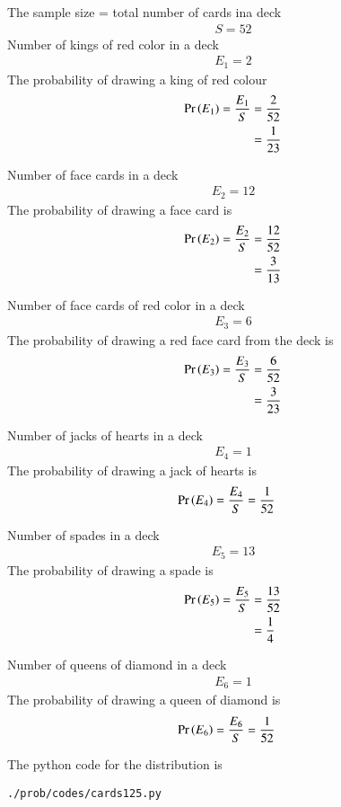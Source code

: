 The sample size = total number of cards ina deck
\begin{align}
S=52
\end{align}
 Number of kings of red color in a deck
\begin{align}
E_1=2
\end{align}
The probability of drawing a king of red colour 
\begin{align}
\Pr\left(E_1\right) = \frac{E_1}{S} &= \frac{2}{52}
\\
&= \frac{1}{23}
\end{align}


 Number of face cards in a deck
\begin{align}
E_2=12
\end{align}
The probability of drawing a face card is 
\begin{align}
\Pr\left(E_2\right) = \frac{E_2}{S} &= \frac{12}{52}
\\
&= \frac{3}{13}
\end{align}


 Number of face cards of red color in a deck
\begin{align}
E_3=6
\end{align}
The probability of drawing a red face card from the deck is 
\begin{align}
\Pr\left(E_3\right) = \frac{E_3}{S} &= \frac{6}{52}
\\
&= \frac{3}{23}
\end{align}


 Number of jacks of hearts in a deck
\begin{align}
E_4=1
\end{align}
The probability of drawing a jack of hearts is 
\begin{align}
\Pr\left(E_4\right) = \frac{E_4}{S} &= \frac{1}{52}
\end{align}


 Number of spades in a deck
\begin{align}
E_5=13
\end{align}
The probability of drawing a spade is 
\begin{align}
\Pr\left(E_5\right) = \frac{E_5}{S} &= \frac{13}{52}
\\
&= \frac{1}{4}
\end{align}


 Number of queens of diamond in a deck
\begin{align}
E_6=1
\end{align}
The probability of drawing a queen of diamond is 
\begin{align}
\Pr\left(E_6\right) = \frac{E_6}{S} &= \frac{1}{52}
\end{align}

The python code for the distribution is
\begin{lstlisting}
./prob/codes/cards125.py
\end{lstlisting}
